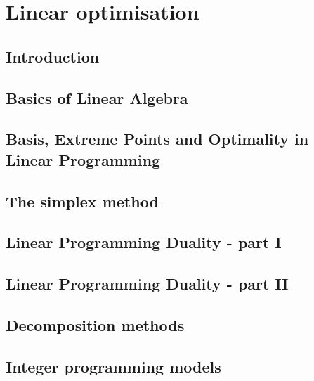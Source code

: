 \documentclass{bookest}
\begin{document}
	

	\tableofcontents
	
	\part{Linear optimisation}
	
	\chapter{Introduction} \label{chapter_1}
	
	
	\chapter{Basics of Linear Algebra} \label{chapter_2}
	
	
	\chapter{Basis, Extreme Points and Optimality in Linear Programming} \label{chapter_3}
		 
	
	\chapter{The simplex method} \label{chapter_4}
		
		
	\chapter{Linear Programming Duality - part I} \label{chapter_5}
		
	
	\chapter{Linear Programming Duality - part II} \label{chapter_6}
	
	
	\chapter{Decomposition methods} \label{chapter_7}
	
	
	\chapter{Integer programming models} \label{chapter_8}
	
	
\end{document}
